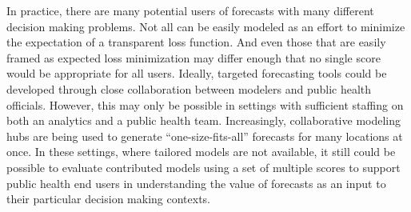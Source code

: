 \documentclass{article}\usepackage[]{graphicx}\usepackage[]{xcolor}
\begin{document}
In practice, there are many potential users of forecasts with many different decision making problems.
Not all can be easily modeled as an effort to minimize the expectation of a transparent loss function.
And even those that are easily framed as expected loss minimization may differ enough that no single score would be
appropriate for all users.
Ideally, targeted forecasting tools could be developed through close collaboration between modelers and public health officials.
However, this may only be possible in settings with sufficient staffing on both an analytics and a public health team.
Increasingly, collaborative modeling hubs are being used to generate ``one-size-fits-all'' forecasts for many locations at once.
In these settings, where tailored models are not available, it still could be possible to evaluate contributed models using a set of multiple scores to support public health end users in understanding the value of forecasts as an input to their particular decision making contexts.


\end{document}
